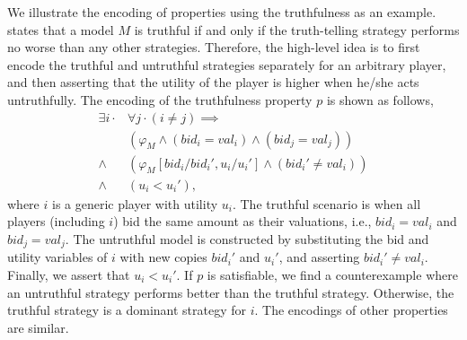 We illustrate the encoding of properties using the truthfulness as an example.
 states that a model $M$ is truthful if and only if the truth-telling
strategy performs no worse than any other strategies.
Therefore, the high-level idea is to first encode the truthful and untruthful strategies separately
for an arbitrary player, and then asserting that the utility of the player is higher when he/she
acts untruthfully.
The encoding of the truthfulness property $p$ is shown as follows,%
\begin{align*}
	\exists i \cdot & \forall j \cdot (i \neq j) \implies \\
	& (\varphi_M \land (bid_i = val_i) \land (bid_j = val_j)) \tag{Truthful} \\
	\land\; & (\varphi_M[bid_i/bid_i', u_i/u_i'] \land (bid_i' \neq val_i)) \tag{Untruthful} \\
	\land\; & (u_i < u_i'), \tag{Utility}
\end{align*}%
where $i$ is a generic player with utility $u_i$.
The truthful scenario is when all players (including $i$) bid the same amount as their valuations,
i.e., $bid_i = val_i$ and $bid_j = val_j$.
The untruthful model is constructed by substituting the bid and utility variables of $i$ with new
copies $bid_i'$ and $u_i'$, and asserting $bid_i' \neq val_i$.
Finally, we assert that $u_i < u_i'$.
If $p$ is satisfiable, we find a counterexample where an untruthful strategy performs better than
the truthful strategy.
Otherwise, the truthful strategy is a dominant strategy for $i$.
The encodings of other properties are similar.



